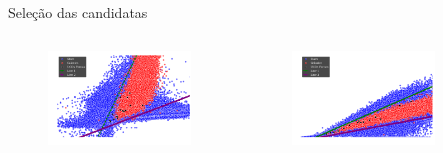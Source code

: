 \begin{frame}[c]{Seleção das candidatas}
\begin{columns}[c]
    \begin{column}{0.32\linewidth}
        \begin{figure}
            \centering
            \includegraphics[width=\linewidth]{images/f_90_20_R_APER_6.png}
        \end{figure}
    \end{column}
    \begin{column}{0.32\linewidth}
        \begin{figure}
            \centering
            \includegraphics[width=\linewidth]{images/f_90_70_FLUX_RADIUS_90_R.png}
        \end{figure}
    \end{column}
    \begin{column}{0.32\linewidth}
        \begin{figure}
            \centering

\end{figure}
\end{column}
\end{columns}
\end{frame}
